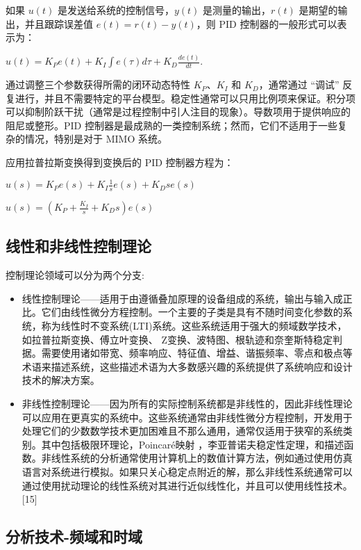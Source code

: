 如果 $u(t)$ 是发送给系统的控制信号，$y(t)$ 是测量的输出，$r(t)$ 是期望的输出，并且跟踪误差值 $e(t) = r(t) - y(t)$，则 PID 控制器的一般形式可以表示为：

$u(t) = K_P e(t) + K_I \int e(\tau) d\tau + K_D \frac{d e(t)}{dt}.$

通过调整三个参数获得所需的闭环动态特性 $K_P$、$K_I$ 和 $K_D$，通常通过 “调试” 反复进行，并且不需要特定的平台模型。稳定性通常可以只用比例项来保证。积分项可以抑制阶跃干扰（通常是过程控制中引人注目的现象）。导数项用于提供响应的阻尼或整形。PID 控制器是最成熟的一类控制系统；然而，它们不适用于一些复杂的情况，特别是对于 MIMO 系统。

应用拉普拉斯变换得到变换后的 PID 控制器方程为：

$u(s) = K_P e(s) + K_I \frac{1}{s} e(s) + K_D s e(s)$


$u(s) = \left(K_P + \frac{K_I}{s} + K_D s \right) e(s)$


\subsection{线性和非线性控制理论}

控制理论领域可以分为两个分支:

\begin{itemize}
\item 线性控制理论——适用于由遵循叠加原理的设备组成的系统，输出与输入成正比。它们由线性微分方程控制。一个主要的子类是具有不随时间变化参数的系统，称为线性时不变系统(LTI)系统。这些系统适用于强大的频域数学技术，如拉普拉斯变换、傅立叶变换、 Z变换、波特图、根轨迹和奈奎斯特稳定判据。需要使用诸如带宽、频率响应、特征值、增益、谐振频率、零点和极点等术语来描述系统，这些描述术语为大多数感兴趣的系统提供了系统响应和设计技术的解决方案。
\item 非线性控制理论——因为所有的实际控制系统都是非线性的，因此非线性理论可以应用在更真实的系统中。这些系统通常由非线性微分方程控制，开发用于处理它们的少数数学技术更加困难且不那么通用，通常仅适用于狭窄的系统类别。其中包括极限环理论，Poincaré映射 ，李亚普诺夫稳定性定理，和描述函数。非线性系统的分析通常使用计算机上的数值计算方法，例如通过使用仿真语言对系统进行模拟。如果只关心稳定点附近的解，那么非线性系统通常可以通过使用扰动理论的线性系统对其进行近似线性化，并且可以使用线性技术。[15]
\end{itemize}

\subsection{分析技术-频域和时域}

